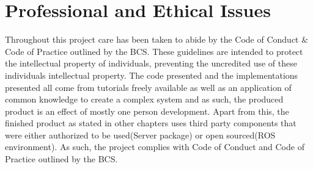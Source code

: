 \chapter{Professional and Ethical Issues}
Throughout this project care has been taken to abide by the Code of Conduct \& Code of Practice outlined by the BCS. These guidelines are intended to protect the intellectual property of individuals, preventing the uncredited use of these individuals intellectual property. The code presented and the implementations presented all come from tutorials freely available as well as an application of common knowledge to create a complex system and as such,  the produced product is an effect of mostly one person development. Apart from this, the finished product as stated in other chapters uses third party components that were either authorized to be used(Server package) or open sourced(ROS environment). As such, the project complies with Code of Conduct and Code of Practice outlined by the BCS.